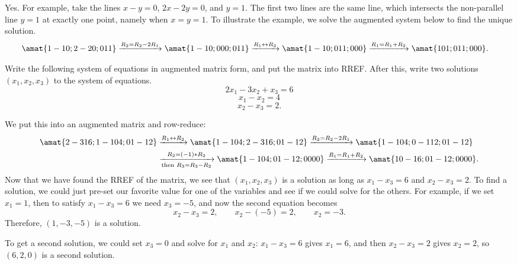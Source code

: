 \begin{problems}
  \begin{solution}
    Yes.  For example, take the lines $x - y = 0$, $2x-2y = 0$, and
    $y =1$.  The first two lines are the same line, which intersects
    the non-parallel line $y=1$ at exactly one point, namely when
    $x=y=1$. To illustrate the example, we solve the augmented system
    below to find the unique solution.
	\begin{align*}
      \amat{1 -1 0; 2 -2 0;  0 1 1} 
      & \xrightarrow[]{R_2 = R_2 -2R_1}
        \amat{1 -1 0; 0 0 0; 0 1 1} \xrightarrow[]{R_1 \leftrightarrow R_2}
        \amat{1 -1 0; 0 1 1; 0 0 0} \xrightarrow[]{R_1 = R_1 + R_2} 
        \amat{1 0 1; 0 1 1; 0 0 0}.
	\end{align*}
  \end{solution}

  \problem Write the following system of equations in augmented matrix
  form, and put the matrix into RREF.  After this, write two solutions
  $(x_1, x_2, x_3)$ 
  to the system of equations.
  \[2x_1 - 3x_2 + x_3 = 6\]
  \[x_1 - x_2 = 4\]
  \[x_2 - x_3 = 2.\]
  \begin{solution}
    We put this into an augmented matrix and row-reduce:
    \begin{align*}
      \amat{2 -3 1 6; 1 -1 0 4; 0 1 -1 2}
      &
        \xrightarrow[]{R_1 \leftrightarrow R_2}
        \amat{1 -1 0 4; 2 -3 1 6; 0 1 -1 2}
        \xrightarrow[]{R_2 = R_2 - 2 R_1}
        \amat{1 -1 0 4; 0 -1 1 2; 0 1 -1 2}
      \\
      &
        \xrightarrow[\textup{then } R_3 = R_3 - R_2]{R_2 = (-1)*R_2}
        \amat{1 -1 0 4; 0 1 -1 2; 0 0 0 0}
        \xrightarrow[]{R_1 = R_1 + R_2}
        \amat{1 0 -1 6; 0 1 -1 2; 0 0 0 0}.
    \end{align*}
    Now that we have found the RREF of the matrix, we see that
    $(x_1, x_2, x_3)$ is a solution as long as $x_1 - x_3 = 6$ and
    $x_2 - x_3 = 2$.  To find a solution, we could just pre-set our
    favorite value for one of the variables and see if we could solve
    for the others.  For example, if we set $x_1 = 1$, then
    to satisfy $x_1 - x_3 = 6$ we need $x_3 = -5$, and now the second
    equation becomes
    \[x_2 - x_3 = 2, \qquad x_2 - (-5) = 2, \qquad x_2 = -3.\]
    Therefore, $(1, -3, -5)$ is a solution.

    To get a second solution, we could set $x_3 = 0$ and solve for $x_1$
    and $x_2$:  $x_1 - x_3 = 6$ gives $x_1 = 6$, and then $x_2-x_3 = 2$
    gives $x_2 = 2$, so $(6, 2, 0)$ is a second solution.


\end{solution}
\end{problems}
